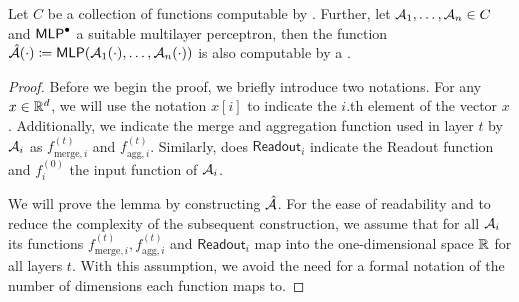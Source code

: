 \begin{lemma}\label{lem:composition_lemma_gnn}
    Let $C$ be a collection of functions computable by \gnns. Further, let  $\mathcal{A}_1, \dots , \mathcal{A}_n \in C$ and $\textsf{MLP}^\bullet$ a suitable multilayer perceptron, then the function $\hat{\mathcal{A}}(\cdot) \coloneqq \textsf{MLP}(\mathcal{A}_1(\cdot), \dots, \mathcal{A}_n(\cdot))$ is also computable by a \gnn.
\end{lemma}

\begin{proof}
    Before we begin the proof, we briefly introduce two notations. For any $x \in \mathbb{R}^d$, we will use the notation $x[i]$ to indicate the $i$.th element of the vector $x$. Additionally, we indicate the merge and aggregation function used in layer $t$ by $\mathcal{A}_i$ as $f^{(t)}_{\text{merge}, i}$ and $f^{(t)}_{\text{agg}, i}$. Similarly, does $\textsf{Readout}_i$ indicate the \textsf{Readout} function and $f^{(0)}_i$ the input function of $\mathcal{A}_i$.
    
    We will prove the lemma by constructing $\hat{\mathcal{A}}$. For the ease of readability and to reduce the complexity of the subsequent construction, we assume that for all $\mathcal{A}_i$ its functions $f^{(t)}_{\text{merge}, i}, f^{(t)}_{\text{agg}, i}$ and $\textsf{Readout}_i$ map into the one-dimensional space $\mathbb{R}$ for all layers $t$. With this assumption, we avoid the need for a formal notation of the number of dimensions each function maps to.


\end{proof}
